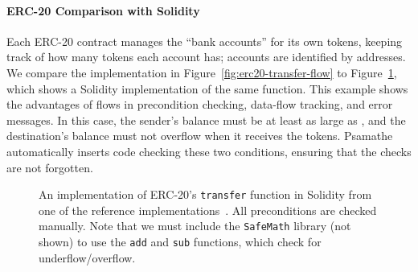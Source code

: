 \documentclass[dvipsnames,runningheads]{llncs}
\begin{document}


\paragraph{ERC-20 Comparison with Solidity}\label{sec:erc20-impl}
Each ERC-20 contract manages the ``bank accounts'' for its own tokens, keeping track of how many tokens each account has; accounts are identified by addresses.
We compare the implementation in Figure~\ref{fig:erc20-transfer-flow} to Figure~\ref{fig:erc20-transfer-sol}, which shows a Solidity implementation of the same function.
This example shows the advantages of flows in precondition checking, data-flow tracking, and error messages.
In this case, the sender's balance must be at least as large as , and the destination's balance must not overflow when it receives the tokens.
Psamathe automatically inserts code checking these two conditions, ensuring that the checks are not forgotten.
\begin{figure}
    \vspace{-2em}
    \centering
    
    \vspace{-1em}
    \caption{An implementation of ERC-20's \lstinline{transfer} function in Solidity from one of the reference implementations~\cite{erc20Consensys}.
        All preconditions are checked manually.
        Note that we must include the \lstinline{SafeMath} library (not shown) to use the \lstinline{add} and \lstinline{sub} functions, which check for underflow/overflow.}
    \label{fig:erc20-transfer-sol}
    \vspace{-2em}
\end{figure}
\end{document}

